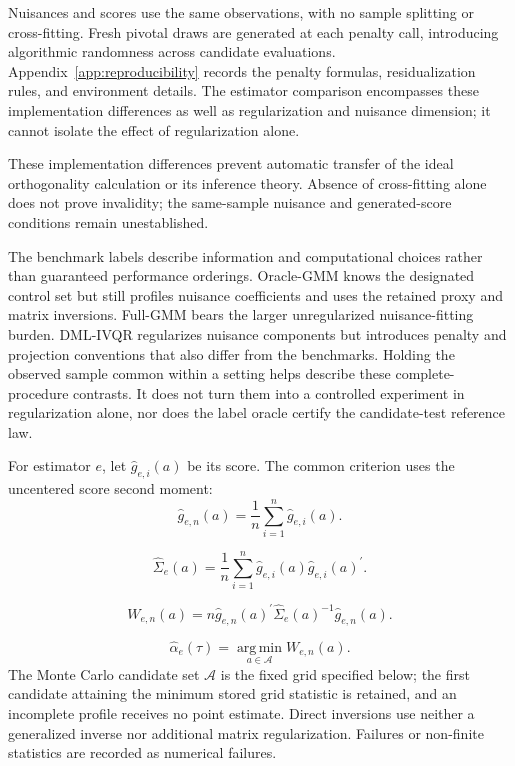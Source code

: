 Nuisances and scores use the same observations, with no sample splitting or cross-fitting. Fresh pivotal draws are generated at each penalty call, introducing algorithmic randomness across candidate evaluations. Appendix~\ref{app:reproducibility} records the penalty formulas, residualization rules, and environment details. The estimator comparison encompasses these implementation differences as well as regularization and nuisance dimension; it cannot isolate the effect of regularization alone.

These implementation differences prevent automatic transfer of the ideal orthogonality calculation or its inference theory. Absence of cross-fitting alone does not prove invalidity; the same-sample nuisance and generated-score conditions remain unestablished.

The benchmark labels describe information and computational choices rather than guaranteed performance orderings. Oracle-GMM knows the designated control set but still profiles nuisance coefficients and uses the retained proxy and matrix inversions. Full-GMM bears the larger unregularized nuisance-fitting burden. DML-IVQR regularizes nuisance components but introduces penalty and projection conventions that also differ from the benchmarks. Holding the observed sample common within a setting helps describe these complete-procedure contrasts. It does not turn them into a controlled experiment in regularization alone, nor does the label oracle certify the candidate-test reference law.

For estimator $e$, let $\widehat g_{e,i}(a)$ be its score. The common criterion uses the uncentered score second moment:
\begin{equation}
    \widehat g_{e,n}(a)
    =
    \frac{1}{n}\sum_{i=1}^{n}\widehat g_{e,i}(a).
    \label{eq:sample-gmm-moment}
\end{equation}

\begin{equation}
    \widehat\Sigma_e(a)
    =
    \frac{1}{n}\sum_{i=1}^{n}
    \widehat g_{e,i}(a)\widehat g_{e,i}(a)^{\prime}.
    \label{eq:score-covariance}
\end{equation}

\begin{equation}
    W_{e,n}(a)
    =
    n\widehat g_{e,n}(a)^{\prime}
    \widehat\Sigma_e(a)^{-1}
    \widehat g_{e,n}(a).
    \label{eq:gmm-criterion}
\end{equation}

\begin{equation}
    \widehat\alpha_e(\tau)
    =
    \operatorname*{arg\,min}_{a\in\mathcal A}W_{e,n}(a).
    \label{eq:gmm-point-estimator}
\end{equation}
The Monte Carlo candidate set $\mathcal A$ is the fixed grid specified below; the first candidate attaining the minimum stored grid statistic is retained, and an incomplete profile receives no point estimate. Direct inversions use neither a generalized inverse nor additional matrix regularization. Failures or non-finite statistics are recorded as numerical failures.

